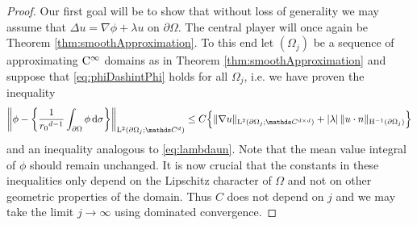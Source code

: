 \begin{proof}
  Our first goal will be to show that without loss of generality we may assume that $\Delta u = \nabla \phi + \lambda u$ on $\partial\Omega$.
  The central player will once again be Theorem \ref{thm:smoothApproximation}.
  To this end let $(\Omega_j)$ be a sequence of approximating $\mathrm{C}^\infty$ domains as in Theorem \ref{thm:smoothApproximation} and suppose that
  \ref{eq:phiDashintPhi} holds for all $\Omega_j$, i.e. we have proven the inequality
  \begin{align}
    \label{eq:phiDashintPhij}
    \bigg\|\phi - \bigg\{ \frac{1}{{r_0}^{d - 1}}\int_{\partial\Omega} \phi \d\sigma \bigg\} \bigg\|_{\Ell^2(\partial\Omega_j; \C^d)}
     \leq C \Big\{ \|\nabla u\|_{\Ell^2(\partial\Omega_j; \C^{d\times d})} + |\lambda| \, \|u\cdot n\|_{\HH^{-1}(\partial\Omega_j)} \Big\}
  \end{align}
  and an inequality analogous to \eqref{eq:lambdaun}.
  Note that the mean value integral of $\phi$ should remain unchanged.
  It is now crucial that the constants in these inequalities only depend on the Lipschitz character of $\Omega$ and not on other geometric properties of the domain.
  Thus $C$ does not depend on $j$ and we may take the limit $j \to \infty$ using dominated convergence.


\end{proof}
